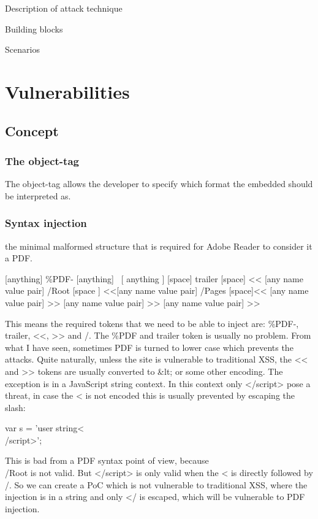 \documentclass[10pt, conference, compsocconf]{IEEEtran}
\begin{document}
Description of attack technique

Building blocks

Scenarios

\section{Vulnerabilities}


\subsection{Concept}



\subsubsection{The object-tag}

The object-tag allows the developer to specify which format 
the embedded should be interpreted as. 

\subsubsection{Syntax injection}

the minimal malformed structure that is required for Adobe 
Reader to consider it a PDF. 

[anything] \%PDF- [anything] \
[ anything ] [space] trailer [space] << [any name value pair] 
/Root [space ] <<[any name value pair] /Pages [space]<< [any name value pair] >> [any name value pair] >> [any name value pair] >>

This means the required tokens that we need to be able to 
inject are: \%PDF-, trailer, <<, >> and /.
The \%PDF and trailer token is usually no problem. From what 
I have seen, sometimes PDF is turned to lower case which 
prevents the attacks. Quite naturally, unless the site is 
vulnerable to traditional XSS, the << and >> tokens are usually 
converted to \&lt; or some other encoding. The exception is in 
a JavaScript string context. In this context only </script> 
pose a threat, in case the < is not encoded this is usually 
prevented by escaping the slash:

var s = 'user string<\\/script>';

This is bad from a PDF syntax point of view, because \\/Root is 
not valid. But </script> is only valid when the < is directly 
followed by /. So we can create a PoC which is not vulnerable to 
traditional XSS, where the injection is  in a string and only </ 
is escaped, which will be vulnerable to PDF injection.
\end{document}

